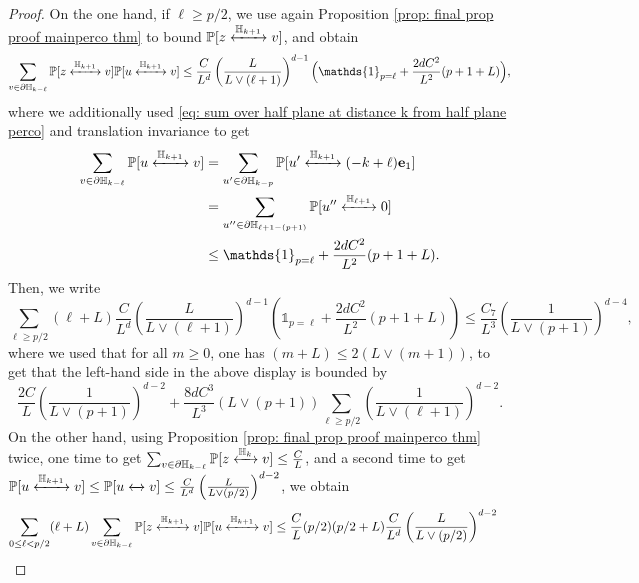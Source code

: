 \documentclass[11pt,a4paper]{article}
\numberwithin{equation}{section}
\theoremstyle{plain}
\theoremstyle{definition}
\newcommand{\connect}{\xleftrightarrow}
\begin{document}
\begin{proof}
On the one hand, if $\ell \geq p/2$, we use again Proposition \ref{prop: final prop proof mainperco thm} to bound $\mathbb P[z\connect{\mathbb H_{k+1}\:}v]$, and obtain
  \begin{equation}
 	\sum_{v\in \partial\mathbb H_{k-\ell}}\mathbb P[z\connect{\mathbb H_{k+1}\:}v]\mathbb P[u\connect{\mathbb H_{k+1}\:}v]\leq \frac{C}{L^d}\left(\frac{L}{L\vee (\ell+1)}\right)^{d-1}\Big(\mathds{1}_{p=\ell}+\frac{2dC^2}{L^2}(p+1+L)\Big),
 \end{equation}
 where we additionally used \eqref{eq: sum over half plane at distance k from half plane perco} and translation invariance to get
 \begin{align}\notag
 	\sum_{v\in \partial\mathbb H_{k-\ell}}\mathbb P[u\connect{\mathbb H_{k+1}\:}v]&=\sum_{u'\in \partial\mathbb H_{k-p}}\mathbb P[u'\connect{\mathbb H_{k+1}\:}(-k+\ell)\mathbf{e}_1]\\&=\sum_{u''\in \partial \mathbb H_{\ell+1-(p+1)}}\mathbb P[u''\connect{\mathbb H_{\ell+1}\:}0]\notag
 	\\&\leq \mathds{1}_{p=\ell}+\frac{2dC^2}{L^2}(p+1+L).
 \end{align}
 Then, we write
 \begin{equation}
 	\sum_{\ell\geq p/2}(\ell +L)\frac{C}{L^d}\left(\frac{L}{L\vee (\ell+1)}\right)^{d-1}\left(\mathds{1}_{p=\ell}+\frac{2dC^2}{L^2}(p+1+L)\right)\leq \frac{C_7}{L^3}\left(\frac{1}{L\vee (p+1)}\right)^{d-4},\label{eq:bound error lower bound full plane perco 5}
 \end{equation}
 where we used that for all $m\geq 0$, one has $(m+L)\leq 2(L\vee (m+1))$, to get that the left-hand side in the above display is bounded by
 \begin{equation}
 	\frac{2C}{L}\left(\frac{1}{L\vee (p+1)}\right)^{d-2}+\frac{8dC^3}{L^3}(L\vee (p+1))\sum_{\ell \geq p/2}\left(\frac{1}{L\vee (\ell+1)}\right)^{d-2}.
 \end{equation}
On the other hand, using Proposition \ref{prop: final prop proof mainperco thm} twice, one time to get $\sum_{v\in \partial \mathbb H_{k-\ell}}\mathbb P[z\connect{\mathbb H_k\:}v]\leq \frac{C}{L}$, and a second time to get $\mathbb P[u\connect{\mathbb H_{k+1}\:}v]\leq \mathbb P[u\connect{}v]\leq \frac{C}{L^d}\left(\frac{L}{L\vee (p/2)}\right)^{d-2}$, we obtain
\begin{align}
\sum_{0\leq \ell<p/2}(\ell+L)\sum_{v\in \partial \mathbb H_{k-\ell}}\mathbb P[z\connect{\mathbb H_{k+1}\:}v]\mathbb P[u\connect{\mathbb H_{k+1}\:}v]&\leq \frac{C}{L}(p/2)(p/2+L)\frac{C}{L^d}\left(\frac{L}{L\vee (p/2)}\right)^{d-2}\notag

\end{align}
\end{proof}
\end{document}

